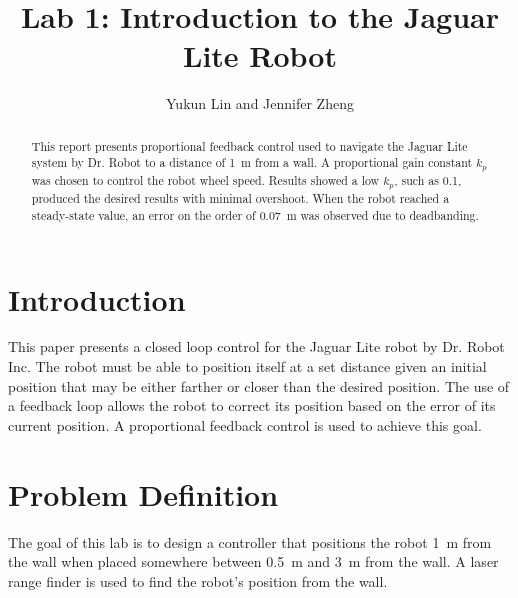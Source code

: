 \documentclass[conference]{../IEEEtran}
\begin{document}
\title{Lab 1: Introduction to the Jaguar Lite Robot}
\author{Yukun Lin and Jennifer Zheng}

\maketitle

\begin{abstract}
This report presents proportional feedback control used to navigate the Jaguar Lite system
by Dr. Robot to a distance of \SI{1}{\meter} from a wall. A proportional gain constant
$k_{p}$ was chosen to control the robot wheel speed. Results showed a low $k_{p}$, such as
0.1, produced the desired results with minimal overshoot. When the robot reached a
steady-state value, an error on the order of \SI{0.07}{\meter} was observed due to
deadbanding.
\end{abstract}

\section{Introduction}
This paper presents a closed loop control for the Jaguar Lite robot by Dr. Robot Inc. The
robot must be able to position itself at a set distance given an initial position that may
be either farther or closer than the desired position. The use of a feedback loop allows
the robot to correct its position based on the error of its current position. A
proportional feedback control is used to achieve this goal.

\section{Problem Definition}
The goal of this lab is to design a controller that positions the robot
\SI{1}{\meter} from the wall when placed somewhere
between \SI{0.5}{\meter} and \SI{3}{\meter} from the wall. A laser range finder is
used to find the robot's position from the wall.
\end{document}
